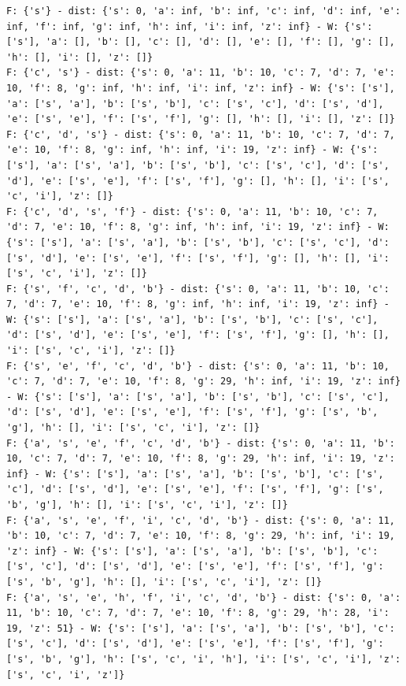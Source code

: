 \documentclass[a4paper,11pt]{report}
\begin{document}
\begin{verbatim}
F: {'s'} - dist: {'s': 0, 'a': inf, 'b': inf, 'c': inf, 'd': inf, 'e': inf, 'f': inf, 'g': inf, 'h': inf, 'i': inf, 'z': inf} - W: {'s': ['s'], 'a': [], 'b': [], 'c': [], 'd': [], 'e': [], 'f': [], 'g': [], 'h': [], 'i': [], 'z': []}
F: {'c', 's'} - dist: {'s': 0, 'a': 11, 'b': 10, 'c': 7, 'd': 7, 'e': 10, 'f': 8, 'g': inf, 'h': inf, 'i': inf, 'z': inf} - W: {'s': ['s'], 'a': ['s', 'a'], 'b': ['s', 'b'], 'c': ['s', 'c'], 'd': ['s', 'd'], 'e': ['s', 'e'], 'f': ['s', 'f'], 'g': [], 'h': [], 'i': [], 'z': []}
F: {'c', 'd', 's'} - dist: {'s': 0, 'a': 11, 'b': 10, 'c': 7, 'd': 7, 'e': 10, 'f': 8, 'g': inf, 'h': inf, 'i': 19, 'z': inf} - W: {'s': ['s'], 'a': ['s', 'a'], 'b': ['s', 'b'], 'c': ['s', 'c'], 'd': ['s', 'd'], 'e': ['s', 'e'], 'f': ['s', 'f'], 'g': [], 'h': [], 'i': ['s', 'c', 'i'], 'z': []}
F: {'c', 'd', 's', 'f'} - dist: {'s': 0, 'a': 11, 'b': 10, 'c': 7, 'd': 7, 'e': 10, 'f': 8, 'g': inf, 'h': inf, 'i': 19, 'z': inf} - W: {'s': ['s'], 'a': ['s', 'a'], 'b': ['s', 'b'], 'c': ['s', 'c'], 'd': ['s', 'd'], 'e': ['s', 'e'], 'f': ['s', 'f'], 'g': [], 'h': [], 'i': ['s', 'c', 'i'], 'z': []}
F: {'s', 'f', 'c', 'd', 'b'} - dist: {'s': 0, 'a': 11, 'b': 10, 'c': 7, 'd': 7, 'e': 10, 'f': 8, 'g': inf, 'h': inf, 'i': 19, 'z': inf} - W: {'s': ['s'], 'a': ['s', 'a'], 'b': ['s', 'b'], 'c': ['s', 'c'], 'd': ['s', 'd'], 'e': ['s', 'e'], 'f': ['s', 'f'], 'g': [], 'h': [], 'i': ['s', 'c', 'i'], 'z': []}
F: {'s', 'e', 'f', 'c', 'd', 'b'} - dist: {'s': 0, 'a': 11, 'b': 10, 'c': 7, 'd': 7, 'e': 10, 'f': 8, 'g': 29, 'h': inf, 'i': 19, 'z': inf} - W: {'s': ['s'], 'a': ['s', 'a'], 'b': ['s', 'b'], 'c': ['s', 'c'], 'd': ['s', 'd'], 'e': ['s', 'e'], 'f': ['s', 'f'], 'g': ['s', 'b', 'g'], 'h': [], 'i': ['s', 'c', 'i'], 'z': []}
F: {'a', 's', 'e', 'f', 'c', 'd', 'b'} - dist: {'s': 0, 'a': 11, 'b': 10, 'c': 7, 'd': 7, 'e': 10, 'f': 8, 'g': 29, 'h': inf, 'i': 19, 'z': inf} - W: {'s': ['s'], 'a': ['s', 'a'], 'b': ['s', 'b'], 'c': ['s', 'c'], 'd': ['s', 'd'], 'e': ['s', 'e'], 'f': ['s', 'f'], 'g': ['s', 'b', 'g'], 'h': [], 'i': ['s', 'c', 'i'], 'z': []}
F: {'a', 's', 'e', 'f', 'i', 'c', 'd', 'b'} - dist: {'s': 0, 'a': 11, 'b': 10, 'c': 7, 'd': 7, 'e': 10, 'f': 8, 'g': 29, 'h': inf, 'i': 19, 'z': inf} - W: {'s': ['s'], 'a': ['s', 'a'], 'b': ['s', 'b'], 'c': ['s', 'c'], 'd': ['s', 'd'], 'e': ['s', 'e'], 'f': ['s', 'f'], 'g': ['s', 'b', 'g'], 'h': [], 'i': ['s', 'c', 'i'], 'z': []}
F: {'a', 's', 'e', 'h', 'f', 'i', 'c', 'd', 'b'} - dist: {'s': 0, 'a': 11, 'b': 10, 'c': 7, 'd': 7, 'e': 10, 'f': 8, 'g': 29, 'h': 28, 'i': 19, 'z': 51} - W: {'s': ['s'], 'a': ['s', 'a'], 'b': ['s', 'b'], 'c': ['s', 'c'], 'd': ['s', 'd'], 'e': ['s', 'e'], 'f': ['s', 'f'], 'g': ['s', 'b', 'g'], 'h': ['s', 'c', 'i', 'h'], 'i': ['s', 'c', 'i'], 'z': ['s', 'c', 'i', 'z']}

\end{verbatim}
\end{document}
